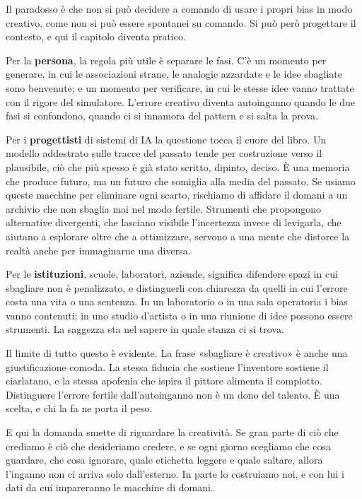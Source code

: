 Il paradosso è che non si può decidere a comando di usare i propri bias in modo creativo, come non si può essere spontanei su comando. Si può però progettare il contesto, e qui il capitolo diventa pratico.

Per la \textbf{persona}, la regola più utile è separare le fasi. C'è un momento per generare, in cui le associazioni strane, le analogie azzardate e le idee sbagliate sono benvenute; e un momento per verificare, in cui le stesse idee vanno trattate con il rigore del simulatore. L'errore creativo diventa autoinganno quando le due fasi si confondono, quando ci si innamora del pattern e si salta la prova.

Per i \textbf{progettisti} di sistemi di IA la questione tocca il cuore del libro. Un modello addestrato sulle tracce del passato tende per costruzione verso il plausibile, ciò che più spesso è già stato scritto, dipinto, deciso. È una memoria che produce futuro, ma un futuro che somiglia alla media del passato. Se usiamo queste macchine per eliminare ogni scarto, rischiamo di affidare il domani a un archivio che non sbaglia mai nel modo fertile. Strumenti che propongono alternative divergenti, che lasciano visibile l'incertezza invece di levigarla, che aiutano a esplorare oltre che a ottimizzare, servono a una mente che distorce la realtà anche per immaginarne una diversa.

Per le \textbf{istituzioni}, scuole, laboratori, aziende, significa difendere spazi in cui sbagliare non è penalizzato, e distinguerli con chiarezza da quelli in cui l'errore costa una vita o una sentenza. In un laboratorio o in una sala operatoria i bias vanno contenuti; in uno studio d'artista o in una riunione di idee possono essere strumenti. La saggezza sta nel sapere in quale stanza ci si trova.

Il limite di tutto questo è evidente. La frase «sbagliare è creativo» è anche una giustificazione comoda. La stessa fiducia che sostiene l'inventore sostiene il ciarlatano, e la stessa apofenia che ispira il pittore alimenta il complotto. Distinguere l'errore fertile dall'autoinganno non è un dono del talento. È una scelta, e chi la fa ne porta il peso.

E qui la domanda smette di riguardare la creatività. Se gran parte di ciò che crediamo è ciò che desideriamo credere, e se ogni giorno scegliamo che cosa guardare, che cosa ignorare, quale etichetta leggere e quale saltare, allora l'inganno non ci arriva solo dall'esterno. In parte lo costruiamo noi, e con lui i dati da cui impareranno le macchine di domani.
